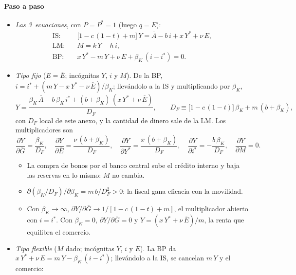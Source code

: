 \documentclass[11pt]{article}
\begin{document}
\paragraph{Paso a paso}


\begin{itemize}
\item \emph{Las 3~ecuaciones}, con $P=P^*=1$ (luego $q=E$):
  \begin{align*}
  \text{IS:}&\quad \big[1-c\,(1-t)+m\big]\,Y=\overline{A}-b\,i+x\,Y^*+\nu\,E,\\
  \text{LM:}&\quad M=k\,Y-h\,i,\\
  \text{BP:}&\quad x\,Y^*-m\,Y+\nu\,E+\beta_K\,(i-i^*)=0 .
  \end{align*}
\item \emph{Tipo fijo} ($E=\overline{E}$; incógnitas $Y$, $i$ y $M$). De la BP, $i=i^*+(m\,Y-x\,Y^*-\nu\,\overline{E})/\beta_K$; llevándolo a la IS y multiplicando por $\beta_K$,
  \begin{equation*}
  Y=\frac{\beta_K\,\overline{A}-b\,\beta_K\,i^*+(b+\beta_K)\,(x\,Y^*+\nu\,\overline{E})}{D_F},\qquad D_F\equiv\big[1-c\,(1-t)\big]\,\beta_K+m\,(b+\beta_K),
  \end{equation*}
  con $D_F$ local de este anexo, y la cantidad de dinero sale de la LM. Los multiplicadores son
  \begin{equation*}
  \frac{\partial Y}{\partial\overline{G}}=\frac{\beta_K}{D_F},\quad \frac{\partial Y}{\partial\overline{E}}=\frac{\nu\,(b+\beta_K)}{D_F},\quad \frac{\partial Y}{\partial Y^*}=\frac{x\,(b+\beta_K)}{D_F},\quad \frac{\partial Y}{\partial i^*}=-\frac{b\,\beta_K}{D_F},\quad \frac{\partial Y}{\partial M}=0 .
  \end{equation*}
  \begin{itemize}
  \item La compra de bonos por el banco central sube el crédito interno y baja las reservas en lo mismo: $M$ no cambia.
  \item $\partial(\beta_K/D_F)/\partial\beta_K=m\,b/D_F^2>0$: la fiscal gana eficacia con la movilidad.
  \item Con $\beta_K\to\infty$, $\partial Y/\partial\overline{G}\to1/[1-c\,(1-t)+m]$, el multiplicador abierto con $i=i^*$. Con $\beta_K=0$, $\partial Y/\partial\overline{G}=0$ y $Y=(x\,Y^*+\nu\,\overline{E})/m$, la renta que equilibra el comercio.
  \end{itemize}
\item \emph{Tipo flexible} ($M$ dado; incógnitas $Y$, $i$ y $E$). La BP da $x\,Y^*+\nu\,E=m\,Y-\beta_K\,(i-i^*)$; llevándolo a la IS, se cancelan $m\,Y$ y el comercio:

\end{itemize}
\end{document}
